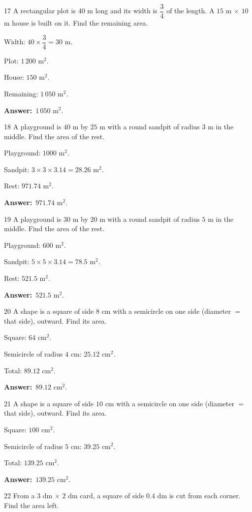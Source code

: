 \documentclass[11pt]{article}
\newif\ifsol \solfalse
\providecommand{\AnsWord}{Đáp số}
\newcommand{\dapso}[1]{\par\textbf{\AnsWord:}\ #1}
\newcommand{\probsol}[1]{%
  \begin{lrbox}{\solmeasure}\begin{minipage}{\dimexpr\linewidth-24pt\relax}#1\end{minipage}\end{lrbox}%
  \ifsol
    \begin{solbox}#1\end{solbox}%
  \else
    \setlength{\solht}{\dimexpr\ht\solmeasure+\dp\solmeasure+0.85cm\relax}%
    \ifdim\solht<1.35cm\setlength{\solht}{1.35cm}\fi
    \begin{tcolorbox}[colback=white,colframe=Line,boxrule=0.8pt,arc=5pt,
      left=8pt,right=8pt,top=4pt,bottom=4pt,height=\solht]{\footnotesize\color{Slate}\itshape\WorkWord}\end{tcolorbox}%
  \fi}
\newcommand{\gap}{\vspace{0.3cm}}
\def\WorkWord{Your work:}
\def\AnsWord{Answer}
\begin{document}
\gap
\begin{probbox}{17}{\relax}
A rectangular plot is $40$ m long and its width is $\dfrac{3}{4}$ of the length. A $15$ m $\times$ $10$ m house is built on it. Find the remaining area.
\end{probbox}
\probsol{
Width: $40\times\dfrac{3}{4}=30$ m.\par Plot: $1\,200$ m$^2$.\par House: $150$ m$^2$.\par Remaining: $1\,050$ m$^2$.
\dapso{$1\,050$ m$^2$.}}
\gap
\begin{probbox}{18}{\relax}
A playground is $40$ m by $25$ m with a round sandpit of radius $3$ m in the middle. Find the area of the rest.
\end{probbox}
\probsol{
Playground: $1000$ m$^2$.\par Sandpit: $3\times3\times3.14=28.26$ m$^2$.\par Rest: $971.74$ m$^2$.
\dapso{$971.74$ m$^2$.}}
\gap
\begin{probbox}{19}{\relax}
A playground is $30$ m by $20$ m with a round sandpit of radius $5$ m in the middle. Find the area of the rest.
\end{probbox}
\probsol{
Playground: $600$ m$^2$.\par Sandpit: $5\times5\times3.14=78.5$ m$^2$.\par Rest: $521.5$ m$^2$.
\dapso{$521.5$ m$^2$.}}
\gap
\begin{probbox}{20}{\relax}
A shape is a square of side $8$ cm with a semicircle on one side (diameter $=$ that side), outward. Find its area.
\end{probbox}
\probsol{
Square: $64$ cm$^2$.\par Semicircle of radius $4$ cm: $25.12$ cm$^2$.\par Total: $89.12$ cm$^2$.
\dapso{$89.12$ cm$^2$.}}
\gap
\begin{probbox}{21}{\relax}
A shape is a square of side $10$ cm with a semicircle on one side (diameter $=$ that side), outward. Find its area.
\end{probbox}
\probsol{
Square: $100$ cm$^2$.\par Semicircle of radius $5$ cm: $39.25$ cm$^2$.\par Total: $139.25$ cm$^2$.
\dapso{$139.25$ cm$^2$.}}
\gap
\begin{probbox}{22}{\relax}
From a $3$ dm $\times$ $2$ dm card, a square of side $0.4$ dm is cut from each corner. Find the area left.
\end{probbox}
\end{document}
